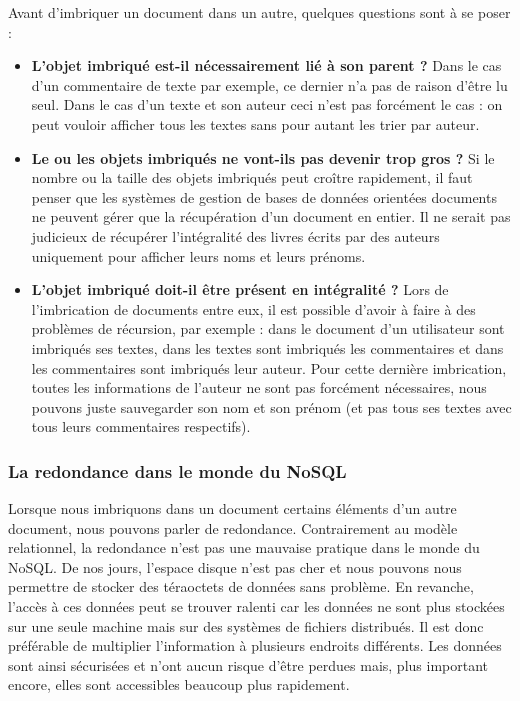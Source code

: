   Avant d'imbriquer un document dans un autre, quelques questions sont à se poser :
  \vspace{10px}
  \begin{itemize}
    \item \textbf{L'objet imbriqué est-il nécessairement lié à son parent ?} Dans le cas d'un commentaire de texte par exemple, ce dernier n'a pas de raison d'être lu seul. Dans le cas d'un texte et son auteur ceci n'est pas forcément le cas : on peut vouloir afficher tous les textes sans pour autant les trier par auteur.
    \item \textbf{Le ou les objets imbriqués ne vont-ils pas devenir trop gros ?} Si le nombre ou la taille des objets imbriqués peut croître rapidement, il faut penser que les systèmes de gestion de bases de données orientées documents ne peuvent gérer que la récupération d'un document en entier. Il ne serait pas judicieux de récupérer l'intégralité des livres écrits par des auteurs uniquement pour afficher leurs noms et leurs prénoms.
    \item \textbf{L'objet imbriqué doit-il être présent en intégralité ?} Lors de l'imbrication de documents entre eux, il est possible d'avoir à faire à des problèmes de récursion, par exemple : dans le document d'un utilisateur sont imbriqués ses textes, dans les textes sont imbriqués les commentaires et dans les commentaires sont imbriqués leur auteur. Pour cette dernière imbrication, toutes les informations de l'auteur ne sont pas forcément nécessaires, nous pouvons juste sauvegarder son nom et son prénom (et pas tous ses textes avec tous leurs commentaires respectifs).
  \end{itemize}

\subsubsection{La redondance dans le monde du NoSQL}

  Lorsque nous imbriquons dans un document certains éléments d'un autre document, nous pouvons parler de redondance. Contrairement au modèle relationnel, la redondance n'est pas une mauvaise pratique dans le monde du NoSQL. De nos jours, l'espace disque n'est pas cher et nous pouvons nous permettre de stocker des téraoctets de données sans problème. En revanche, l'accès à ces données peut se trouver ralenti car les données ne sont plus stockées sur une seule machine mais sur des systèmes de fichiers distribués. Il est donc préférable de multiplier l'information à plusieurs endroits différents. Les données sont ainsi sécurisées et n'ont aucun risque d'être perdues mais, plus important encore, elles sont accessibles beaucoup plus rapidement.\\


